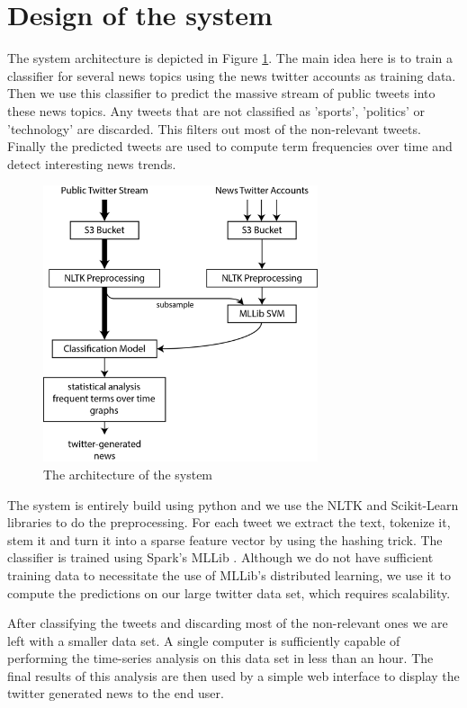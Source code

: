 \documentclass{llncs}
\begin{document}
\section{Design of the system}
The system architecture is depicted in Figure \ref{fig:architecture}. The main idea here is to train a classifier for several news topics using the news twitter accounts as training data. Then we use this classifier to predict the massive stream of public tweets into these news topics. Any tweets that are not classified as 'sports', 'politics' or 'technology' are discarded. This filters out most of the non-relevant tweets. Finally the predicted tweets are used to compute term frequencies over time and detect interesting news trends.

\begin{figure}
	\centering
	\includegraphics[width=0.72\textwidth]{images/system_arch.png} 
	\caption{The architecture of the system}
	\label{fig:architecture}
\end{figure}

The system is entirely build using python and we use the NLTK \cite{nltk} and Scikit-Learn \cite{scikit-learn} libraries to do the preprocessing. For each tweet we extract the text, tokenize it, stem it and turn it into a sparse feature vector by using the hashing trick. The classifier is trained using Spark's MLLib \cite{mllib}. Although we do not have sufficient training data to necessitate the use of MLLib's distributed learning, we use it to compute the predictions on our large twitter data set, which requires scalability.

After classifying the tweets and discarding most of the non-relevant ones we are left with a smaller data set. A single computer is sufficiently capable of performing the time-series analysis on this data set in less than an hour. The final results of this analysis are then used by a simple web interface to display the twitter generated news to the end user.
\end{document}
